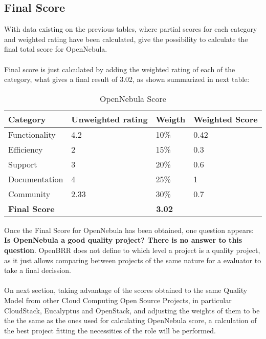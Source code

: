 \documentclass[11pt]{article}
\begin{document}
\subsection{Final Score}\label{sec:final_score}
With data existing on the previous tables, where partial scores for each category and weighted rating have been calculated, give the possibility to calculate the final total score for OpenNebula.\\
\\
Final score is just calculated by adding the weighted rating of each of the category, what gives a final result of 3.02, as shown summarized in next table:
\begin{table}[H]
  \begin{center}
    \begin{tabular}{ | p{3cm} | p{2.5cm} | p{1.5cm} | p{2cm} | }
    \toprule
    \textbf{Category} & \textbf{Unweighted rating} & \textbf{Weigth} & \textbf{Weighted Score}\\
    \hline
    Functionality & 4.2 & 10\% & 0.42\\
    \hline
    Efficiency & 2 & 15\% & 0.3\\
    \hline
    Support & 3 & 20\% & 0.6\\
    \hline
    Documentation & 4 & 25\% & 1\\
    \hline
    Community & 2.33 & 30\% & 0.7\\
    \midrule
    \textbf{Final Score} & \multicolumn {3}{c|}{\textbf{3.02}}\\
    \bottomrule
    \end{tabular}
    \caption{OpenNebula Score}
    \label{tab:final_score}
  \end{center}
\end{table}
Once the Final Score for OpenNebula has been obtained, one question appears: \textbf{Is OpenNebula a good quality project? There is no answer to this question}. OpenBRR does not define to which level a project is a quality project, as it just allows comparing between projects of the same nature for a evaluator to take a final decission.\\
\\
On next section, taking advantage of the scores obtained to the same Quality Model from other Cloud Computing Open Source Projects, in particular CloudStack, Eucalyptus and OpenStack, and adjusting the weights of them to be the the same as the ones used for calculating OpenNebula score, a calculation of the best project fitting the necessities of the role will be performed.
\end{document}

